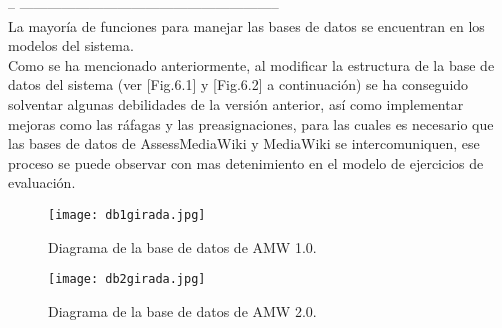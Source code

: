 -- --------------------------------------------------------\\


La mayoría de funciones para manejar las bases de datos se encuentran en los modelos del sistema.\\

Como se ha mencionado anteriormente, al modificar la estructura de la base de datos del sistema (ver [Fig.6.1] y [Fig.6.2] a continuación) se ha conseguido solventar algunas debilidades de la versión anterior, así como implementar mejoras como las ráfagas y las preasignaciones, para las cuales es necesario que las bases de datos de AssessMediaWiki y MediaWiki se intercomuniquen, ese proceso se puede observar con mas detenimiento en el modelo de ejercicios de evaluación.

\clearpage

\begin{figure}
	\centering
	\texttt{[image: db1girada.jpg]}
	\caption{Diagrama de la base de datos de AMW 1.0.}
\end{figure}

\begin{figure}
	\centering
	\texttt{[image: db2girada.jpg]}
	\caption{Diagrama de la base de datos de AMW 2.0.}
\end{figure}

\clearpage